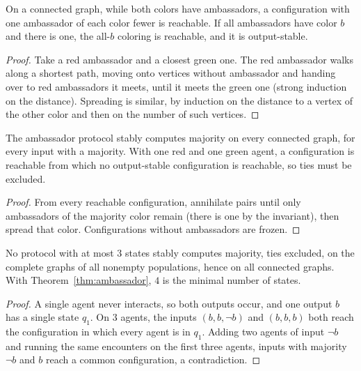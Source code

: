 \begin{lemma}\label{lem:amb-steps}
\leanok{}
On a connected graph, while both colors have ambassadors, a configuration with one ambassador
of each color fewer is reachable. If all ambassadors have color $b$ and there is one, the all-$b$
coloring is reachable, and it is output-stable.
\end{lemma}
\begin{proof}\leanok
Take a red ambassador and a closest green one. The red ambassador walks along a shortest path,
moving onto vertices without ambassador and handing over to red ambassadors it meets, until it
meets the green one (strong induction on the distance). Spreading is similar, by induction on the
distance to a vertex of the other color and then on the number of such vertices.
\end{proof}

\begin{theorem}\label{thm:ambassador}
\leanok{}
The ambassador protocol stably computes majority on every connected graph, for every input with
a majority. With one red and one green agent, a configuration is reachable from which no
output-stable configuration is reachable, so ties must be excluded.
\end{theorem}
\begin{proof}\leanok
From every reachable configuration, annihilate pairs until only ambassadors of the majority
color remain (there is one by the invariant), then spread that color. Configurations without
ambassadors are frozen.
\end{proof}

\begin{theorem}\label{thm:three-states}
\leanok{}
No protocol with at most $3$ states stably computes majority, ties excluded, on the complete
graphs of all nonempty populations, hence on all connected graphs. With
Theorem~\ref{thm:ambassador}, $4$ is the minimal number of states.
\end{theorem}
\begin{proof}\leanok
A single agent never interacts, so both outputs occur, and one output $b$ has a single state
$q_1$. On $3$ agents, the inputs $(b, b, \lnot b)$ and $(b, b, b)$ both reach the configuration in
which every agent is in $q_1$. Adding two agents of input $\lnot b$ and running the same encounters
on the first three agents, inputs with majority $\lnot b$ and $b$ reach a common configuration, a
contradiction.
\end{proof}

